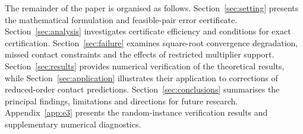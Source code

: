 The remainder of the paper is organised as follows. Section~\ref{sec:setting} presents the mathematical formulation and feasible-pair error
certificate. Section~\ref{sec:analysis} investigates certificate efficiency and conditions for exact certification. Section~\ref{sec:failure}
examines square-root convergence degradation, missed contact constraints and the effects of restricted multiplier support.
Section~\ref{sec:results} provides numerical verification of the theoretical results, while Section~\ref{sec:application} illustrates their
application to corrections of reduced-order contact predictions. Section~\ref{sec:conclusions} summarises the principal findings, limitations
and directions for future research. Appendix~\ref{app:e3} presents the random-instance verification results and supplementary numerical diagnostics.
